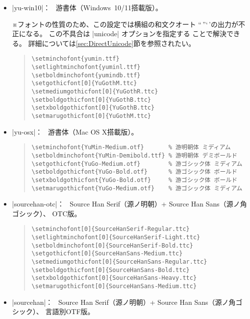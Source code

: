 \documentclass[uplatex,dvipdfmx,a4paper]{jsarticle}
\newcommand{\Note}{\par\noindent ※}
\newcommand{\Means}{：\ }
\begin{document}
\begin{itemize}
\item |yu-win10|\Means
  游書体（Windows~10/11搭載版）。
  \Note フォントの性質のため、この設定では横組の和文クオート
  “\,”‘\,’の出力が不正になる。
  この不具合は |unicode| オプションを指定する
  ことで解決できる。
  詳細については\ref{sec:DirectUnicode}節を参照されたい。

\begin{quote}\small\begin{verbatim}
\setminchofont{yumin.ttf}
\setlightminchofont{yuminl.ttf}
\setboldminchofont{yumindb.ttf}
\setgothicfont[0]{YuGothM.ttc}
\setmediumgothicfont[0]{YuGothR.ttc}
\setboldgothicfont[0]{YuGothB.ttc}
\setxboldgothicfont[0]{YuGothB.ttc}
\setmarugothicfont[0]{YuGothM.ttc}
\end{verbatim}\end{quote}

\item |yu-osx|\Means
  游書体（Mac OS X搭載版）。
\begin{quote}\small\begin{verbatim}
\setminchofont{YuMin-Medium.otf}       % 游明朝体 ミディアム
\setboldminchofont{YuMin-Demibold.ttf} % 游明朝体 デミボールド
\setgothicfont{YuGo-Medium.otf}        % 游ゴシック体 ミディアム
\setboldgothicfont{YuGo-Bold.otf}      % 游ゴシック体 ボールド
\setxboldgothicfont{YuGo-Bold.otf}     % 游ゴシック体 ボールド
\setmarugothicfont{YuGo-Medium.otf}    % 游ゴシック体 ミディアム
\end{verbatim}\end{quote}

\item |sourcehan-otc|\Means
  Source Han Serif（源ノ明朝）+ Source Han Sans（源ノ角ゴシック）、
  OTC版。

\begin{quote}\small\begin{verbatim}
\setminchofont[0]{SourceHanSerif-Regular.ttc}
\setlightminchofont[0]{SourceHanSerif-Light.ttc}
\setboldminchofont[0]{SourceHanSerif-Bold.ttc}
\setgothicfont[0]{SourceHanSans-Medium.ttc}
\setmediumgothicfont[0]{SourceHanSans-Regular.ttc}
\setboldgothicfont[0]{SourceHanSans-Bold.ttc}
\setxboldgothicfont[0]{SourceHanSans-Heavy.ttc}
\setmarugothicfont[0]{SourceHanSans-Medium.ttc}
\end{verbatim}\end{quote}

\item |sourcehan|\Means
  Source Han Serif（源ノ明朝）+ Source Han Sans（源ノ角ゴシック）、
  言語別OTF版。


\end{itemize}
\end{document}
